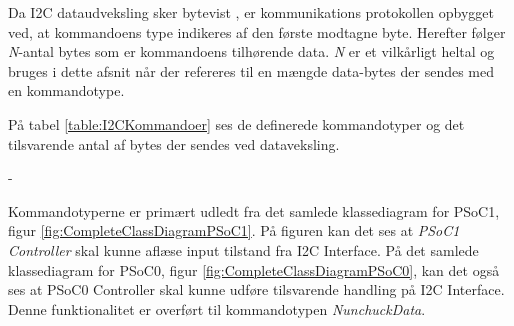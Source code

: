 \noindent Da I2C dataudveksling sker bytevist \cite{I2C}, er kommunikations protokollen opbygget ved, at kommandoens type indikeres af den første modtagne byte. Herefter følger \textit{N}-antal bytes som er kommandoens tilhørende data. \textit{N} er et vilkårligt heltal og bruges i dette afsnit når der refereres til en mængde data-bytes der sendes med en kommandotype.\newline

\noindent På tabel \ref{table:I2CKommandoer} ses de definerede kommandotyper og det tilsvarende antal af bytes der sendes ved dataveksling.

\begin{table}[H]
	\begin{adjustwidth}{-3cm}{-\rightmargin}
		\centering
		\caption{I2C kommunikation kommandotyper}
		\label{table:I2CKommandoer}
	\end{adjustwidth}
\end{table}

Kommandotyperne er primært udledt fra det samlede klassediagram for PSoC1, figur \ref{fig:CompleteClassDiagramPSoC1}. På figuren kan det ses at \textit{PSoC1 Controller} skal kunne aflæse input tilstand fra I2C Interface. På det samlede klassediagram for PSoC0, figur \ref{fig:CompleteClassDiagramPSoC0}, kan det også ses at PSoC0 Controller skal kunne udføre tilsvarende handling på I2C Interface. Denne funktionalitet er overført til kommandotypen \textit{NunchuckData}.

